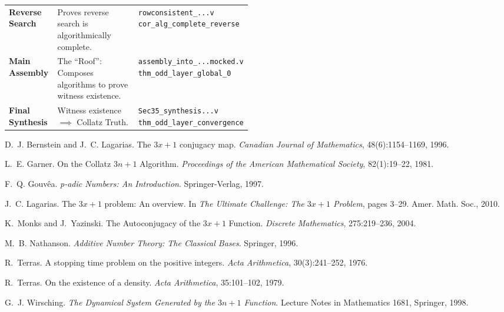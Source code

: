 \documentclass[11pt,letterpaper]{amsart}
\theoremstyle{definition}
\theoremstyle{plain}
\theoremstyle{plain}
\theoremstyle{remark}
\begin{document}
\begin{xltabular}{\linewidth}{@{}>{\raggedright\arraybackslash}p{0.20\linewidth} X >{\raggedright\arraybackslash}p{0.28\linewidth}@{}}
\textbf{Reverse Search} &
  Proves reverse search is algorithmically complete. &
  \texttt{rowconsistent\_...v} \newline
  \texttt{cor\_alg\_complete\_reverse} \\
\addlinespace[4pt]

\textbf{Main Assembly} &
  The ``Roof'': Composes algorithms to prove witness existence. &
  \texttt{assembly\_into\_...mocked.v} \newline
  \texttt{thm\_odd\_layer\_global\_0} \\
\addlinespace[4pt]

\textbf{Final Synthesis} &
  Witness existence $\implies$ Collatz Truth. &
  \texttt{Sec35\_synthesis...v} \newline
  \texttt{thm\_odd\_layer\_convergence} \\

\end{xltabular}
\endgroup

\begin{thebibliography}{99}

D.~J. Bernstein and J.~C. Lagarias.
\newblock The $3x+1$ conjugacy map.
\newblock \emph{Canadian Journal of Mathematics}, 48(6):1154--1169, 1996.

L.~E. Garner.
\newblock On the Collatz $3n + 1$ Algorithm.
\newblock \emph{Proceedings of the American Mathematical Society}, 82(1):19--22, 1981.

F.~Q. Gouvêa.
\newblock \emph{p-adic Numbers: An Introduction}.
\newblock Springer-Verlag, 1997.

J.~C. Lagarias.
\newblock The $3x+1$ problem: An overview.
\newblock In \emph{The Ultimate Challenge: The $3x+1$ Problem}, pages 3--29. Amer. Math. Soc., 2010.

K.~Monks and J.~Yazinski.
\newblock The Autoconjugacy of the $3x+1$ Function.
\newblock \emph{Discrete Mathematics}, 275:219--236, 2004.

M.~B. Nathanson.
\newblock \emph{Additive Number Theory: The Classical Bases}.
\newblock Springer, 1996.

R.~Terras.
\newblock A stopping time problem on the positive integers.
\newblock \emph{Acta Arithmetica}, 30(3):241--252, 1976.

R.~Terras.
\newblock On the existence of a density.
\newblock \emph{Acta Arithmetica}, 35:101--102, 1979.

G.~J. Wirsching.
\newblock \emph{The Dynamical System Generated by the $3n+1$ Function}.
\newblock Lecture Notes in Mathematics 1681, Springer, 1998.

\end{thebibliography}
\end{document}
